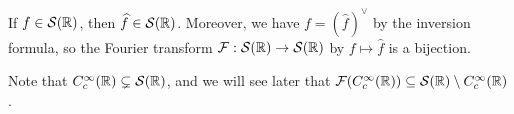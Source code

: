 \begin{theorem}
  If $f \in \mathcal{S}(\mathbb{R})$, then
  $\widehat{f} \in \mathcal{S}(\mathbb{R})$.
  Moreover, we have
  $f = (\widehat{f})^\vee$ by the inversion
  formula, so the
  Fourier transform $\mathcal{F} : \mathcal{S}(\mathbb{R}) \to \mathcal{S}(\mathbb{R})$
  by $f \mapsto \widehat{f}$
  is a bijection.
\end{theorem}

\begin{remark}
  Note that $C^\infty_c(\mathbb{R}) \subsetneq \mathcal{S}(\mathbb{R})$, and
  we will see later that
  $\mathcal{F}(C^\infty_c(\mathbb{R})) \subseteq \mathcal{S}(\mathbb{R}) \setminus C^\infty_c(\mathbb{R})$.
\end{remark}

